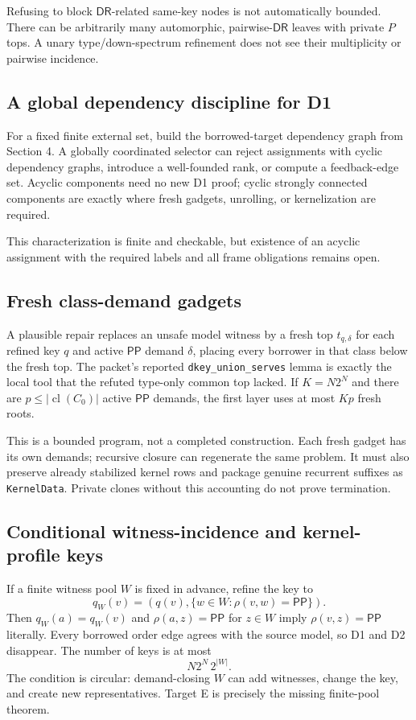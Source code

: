 \documentclass[11pt]{article}
\newcommand{\PP}{\mathsf{PP}}
\newcommand{\DR}{\mathsf{DR}}
\newcommand{\cl}{\operatorname{cl}}
\begin{document}
Refusing to block $\DR$-related same-key nodes is not automatically bounded. There can
be arbitrarily many automorphic, pairwise-$\DR$ leaves with private $P$ tops. A unary
type/down-spectrum refinement does not see their multiplicity or pairwise incidence.

\subsection{A global dependency discipline for D1}

For a fixed finite external set, build the borrowed-target dependency graph from
Section 4. A globally coordinated selector can reject assignments with cyclic dependency
graphs, introduce a well-founded rank, or compute a feedback-edge set. Acyclic components
need no new D1 proof; cyclic strongly connected components are exactly where fresh
gadgets, unrolling, or kernelization are required.

This characterization is finite and checkable, but existence of an acyclic assignment
with the required labels and all frame obligations remains open.

\subsection{Fresh class-demand gadgets}

A plausible repair replaces an unsafe model witness by a fresh top
$t_{q,\delta}$ for each refined key $q$ and active $\PP$ demand $\delta$, placing every
borrower in that class below the fresh top. The packet's reported
\texttt{dkey\_union\_serves} lemma is exactly the local tool that the refuted type-only
common top lacked. If $K=N2^N$ and there are $p\le |\cl(C_0)|$ active $\PP$ demands,
the first layer uses at most $Kp$ fresh roots.

This is a bounded program, not a completed construction. Each fresh gadget has its own
demands; recursive closure can regenerate the same problem. It must also preserve
already stabilized kernel rows and package genuine recurrent suffixes as
\texttt{KernelData}. Private clones without this accounting do not prove termination.

\subsection{Conditional witness-incidence and kernel-profile keys}

If a finite witness pool $W$ is fixed in advance, refine the key to
\[
  q_W(v)=\left(q(v),\{w\in W:\rho(v,w)=\PP\}\right).
\]
Then $q_W(a)=q_W(v)$ and $\rho(a,z)=\PP$ for $z\in W$ imply
$\rho(v,z)=\PP$ literally. Every borrowed order edge agrees with the source model, so
D1 and D2 disappear. The number of keys is at most
\[
  N2^N\,2^{|W|}.
\]
The condition is circular: demand-closing $W$ can add witnesses, change the key, and
create new representatives. Target E is precisely the missing finite-pool theorem.
\end{document}
